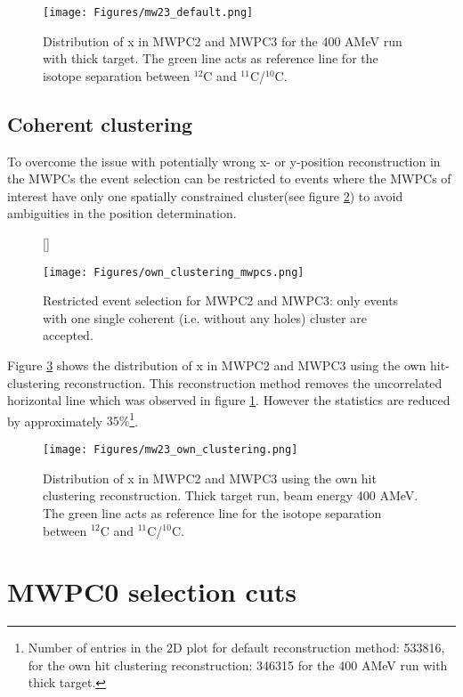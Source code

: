 \begin{appendices}
\begin{figure}[htpb]
    \centering
    \texttt{[image: Figures/mw23\_default.png]}
    \caption{
   	 Distribution of x in MWPC2 and MWPC3 for the 400 AMeV run with thick target. The green line acts as reference line for the isotope separation between $^{12}$C and $^{11}$C/$^{10}$C.
     }
    \label{fig:x_mw23_default}
\end{figure}


\subsection {Coherent clustering} 

To overcome the issue with potentially wrong x- or y-position reconstruction in the MWPCs the event selection can be restricted to events where the MWPCs of interest have only one spatially constrained cluster(see figure \ref{fig:own_clustering}) to avoid ambiguities in the position determination.\newline
\begin{figure}
[\FBwidth]
{\caption{Restricted event selection for MWPC2 and MWPC3: only events with one single coherent (i.e. without any holes) cluster are accepted.}\label{fig:own_clustering}}
{\texttt{[image: Figures/own\_clustering\_mwpcs.png]}}
\end{figure}
Figure \ref{fig:mw23_own_clustering} shows the distribution of x in MWPC2 and MWPC3 using the own hit-clustering reconstruction. This reconstruction method removes the uncorrelated horizontal line which was observed in figure \ref{fig:x_mw23_default}. However the statistics are reduced by approximately $35\%$\footnote{Number of entries in the 2D plot for default reconstruction method: 533816, for the own hit clustering reconstruction: 346315 for the 400 AMeV run with thick target.}.
\begin{figure}[htpb]
    \centering
    \texttt{[image: Figures/mw23\_own\_clustering.png]}
    \caption{
   	 Distribution of x in MWPC2 and MWPC3 using the own hit clustering reconstruction. Thick target run, beam energy 400 AMeV. The green line acts as reference line for the isotope separation between $^{12}$C and $^{11}$C/$^{10}$C.
     }
    \label{fig:mw23_own_clustering}
\end{figure}

\section {MWPC0 selection cuts}\label{app:mw0_cuts}


\end{appendices}
